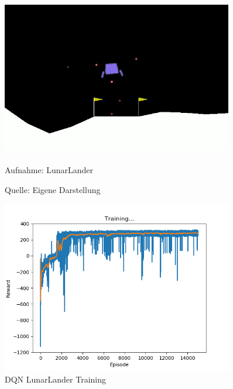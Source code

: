 \documentclass[12pt,a4paper]{article}
\begin{document}
\begin{figure}[!h]
	\centering
	\begin{minipage}{.5\textwidth}
		\centering
		\includegraphics[width=0.9\textwidth]{gfx/LunarLander}
		\caption{Aufnahme: LunarLander}
		Quelle: Eigene Darstellung
		\label{fig:pract:lunar}
	\end{minipage}%
	\begin{minipage}{.5\textwidth}
		\centering
		\includegraphics[width=0.9\textwidth]{gfx/dqn_lunarlander_model_15000}
		\caption{DQN LunarLander Training}
		\label{fig:pract:lunar:dqn}
	\end{minipage}
\end{figure}

\newpage
\end{document}
